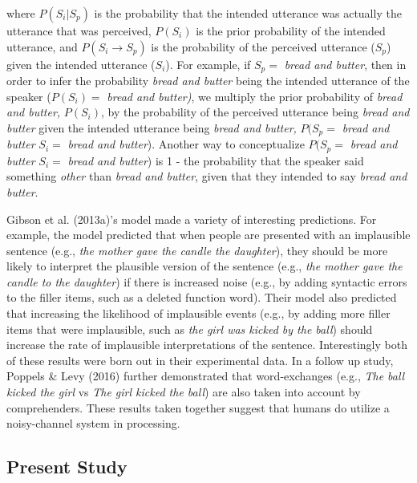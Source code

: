 \documentclass[10pt, letterpaper]{article}
\begin{document}
\noindent where \(P(S_i|S_p)\) is the probability that the intended
utterance was actually the utterance that was perceived, \(P(S_i)\) is
the prior probability of the intended utterance, and \(P(S_i \to S_p)\)
is the probability of the perceived utterance (\(S_p\)) given the
intended utterance (\(S_i\)). For example, if \(S_p =\) \emph{bread and
butter}, then in order to infer the probability \emph{bread and butter}
being the intended utterance of the speaker (\(P(S_i)=\) \emph{bread and
butter)}, we multiply the prior probability of \emph{bread and butter,}
\(P(S_i)\), by the probability of the perceived utterance being
\emph{bread and butter} given the intended utterance being \emph{bread
and butter,} \(P(S_p =\) \emph{bread and butter} \textbar{} \(S_i=\)
\emph{bread and butter}). Another way to conceptualize \(P(S_p =\)
\emph{bread and butter} \textbar{} \(S_i=\) \emph{bread and butter}) is
1 - the probability that the speaker said something \emph{other} than
\emph{bread and butter}, given that they intended to say \emph{bread and
butter}.

Gibson et al. (2013a)'s model made a variety of interesting predictions.
For example, the model predicted that when people are presented with an
implausible sentence (e.g., \emph{the mother gave the candle the
daughter}), they should be more likely to interpret the plausible
version of the sentence (e.g., \emph{the mother gave the candle to the
daughter}) if there is increased noise (e.g., by adding syntactic errors
to the filler items, such as a deleted function word). Their model also
predicted that increasing the likelihood of implausible events (e.g., by
adding more filler items that were implausible, such as \emph{the girl
was kicked by the ball}) should increase the rate of implausible
interpretations of the sentence. Interestingly both of these results
were born out in their experimental data. In a follow up study, Poppels
\& Levy (2016) further demonstrated that word-exchanges (e.g., \emph{The
ball kicked the girl} vs \emph{The girl kicked the ball}) are also taken
into account by comprehenders. These results taken together suggest that
humans do utilize a noisy-channel system in processing.

\hypertarget{present-study}{%
\subsection{Present Study}\label{present-study}}
\end{document}

